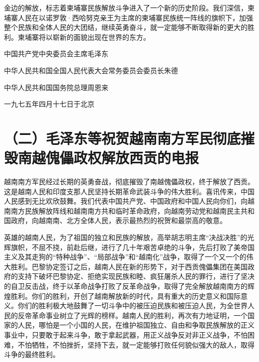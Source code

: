 金边的解放，标志着柬埔寨民族解放斗争进入了一个新的历史阶段。我们深信，柬埔寨人民在以诺罗敦·西哈努克亲王为主席的柬埔寨民族统一阵线的旗帜下，加强整个民族和全体人民的大团结，继续英勇奋斗，就一定能够不断取得新的更大的胜利。柬埔寨将以崭新的面貌出现在世界的东方。

中国共产党中央委员会主席毛泽东

中华人民共和国全国人民代表大会常务委员会委员长朱德

中华人民共和国国务院总理周恩来

一九七五年四月十七日于北京

\date{一九七五年四月三十日}
\section*{（二）毛泽东等祝贺越南南方军民彻底摧毁南越傀儡政权解放西贡的电报}









越南南方军民经过长期的英勇奋战，彻底摧毁了南越傀儡政权，终于解放了西贡。这是越南人民和印度支那人民坚持长期革命武装斗争的伟大胜利。喜讯传来，中国人民感到无比欢欣鼓舞。我们代表中国共产党、中国政府和中国人民向你们，向越南南方民族解放阵线和越南南方共和临时革命政府，向越南劳动党和越南民主共和国政府，向越南南、北方全体人民，表示最热烈的祝贺和最崇高的敬意。

英雄的越南人民，为了祖国的独立和民族的解放，高举胡志明主席“决战决胜”的光辉旗帜，不屈不挠，前赴后继，进行了几十年艰苦卓绝的斗争，先后打败了美帝国主义及其走狗的“特种战争”、“局部战争”和“越南化”战争，取得了一个又一个的伟大胜利。巴黎协定签订之后，越南人民在新的形势下，对于西贡傀儡集团在美国政府的支持下破坏巴黎协定、拒绝实现民族和睦、疯狂屠杀人民的罪行，进行了坚决的自卫反击战，终于以革命战争打败了反革命战争，取得了完全解放越南南方的辉煌胜利。你们的胜利，开创了越南解放新的时代，具有重大的历史意义和国际意义。你们的胜利极大地鼓舞了一切斗争中的被压迫民族和被压迫人民，为全世界人民的反帝革命事业树立了光辉的榜样。越南人民的胜利，再次有力地证明，一个国家的人民，哪怕是一个小国的人民，在维护祖国独立、自由和争取民族解放的正义事业中，只要敢于起来斗争，敢于拿起武器，用正义战争反对非正义战争，不怕困难，不怕牺牲，不怕挫折，坚持下去，就一定能够打败任何貌似强大的敌人，取得斗争的最终胜利。

